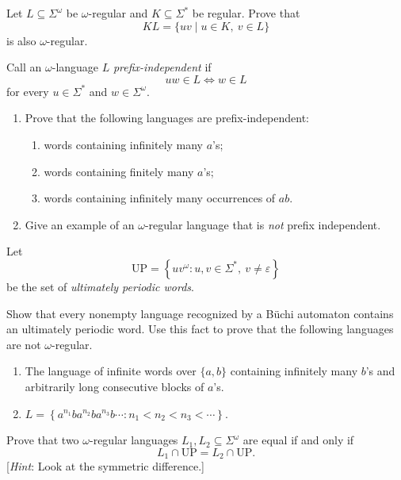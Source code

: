 \documentclass[11pt,a4paper]{tutorial}
\begin{document}
\begin{exercise}
Let $L\subseteq\Sigma^\omega$ be $\omega$-regular and
$K\subseteq\Sigma^*$ be regular.
Prove that
\[
KL=\{uv \mid u\in K,\ v\in L\}
\]
is also $\omega$-regular.
\end{exercise}

\begin{exercise}
Call an $\omega$-language $L$ \emph{prefix-independent} if
\[
uw\in L\iff w\in L
\]
for every $u\in\Sigma^*$ and $w\in\Sigma^\omega$.

\begin{enumerate}
\item Prove that the following languages are prefix-independent:
\begin{enumerate}
\item words containing infinitely many $a$'s;
\item words containing finitely many $a$'s;
\item words containing infinitely many occurrences of $ab$.
\end{enumerate}
\item Give an example of an $\omega$-regular language 
that is \emph{not} prefix independent.
\end{enumerate}
\end{exercise}

\begin{exercise}
Let
\[
\mathrm{UP}=\left\{uv^\omega:u,v\in\Sigma^*,\ v\ne\varepsilon\right\}
\]
be the set of \emph{ultimately periodic words}.

Show that every nonempty language recognized by a Büchi automaton contains
an ultimately periodic word.
Use this fact to prove that the following languages are not $\omega$-regular.
\begin{enumerate}%
\item The language of infinite words over $\{a,b\}$ containing
infinitely many $b$'s and arbitrarily long consecutive blocks of $a$'s.
\item\hfil
\(
L=\left\{
a^{n_1}ba^{n_2}ba^{n_3}b\cdots:
n_1<n_2<n_3<\cdots
\right\}.
\)
\hfil
\end{enumerate}
\medskip
\noindent
Prove that two $\omega$-regular languages
$L_1,L_2\subseteq\Sigma^\omega$ are equal if and only if
\[
L_1\cap\mathrm{UP}
=
L_2\cap\mathrm{UP}.
\]
[\textit{Hint}: Look at the symmetric difference.]
\end{exercise}
\end{document}

